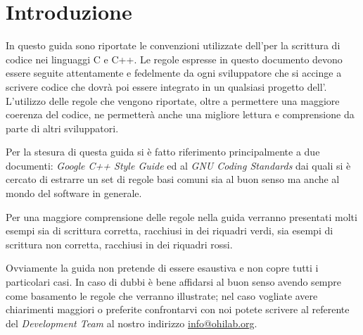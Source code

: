 %

\section{Introduzione}\label{sec:overview}

In questo guida sono riportate le convenzioni utilizzate dell'\associazione per la scrittura di codice nei linguaggi C e C++.
Le regole espresse in questo documento devono essere seguite attentamente e fedelmente da ogni sviluppatore che si accinge a scrivere codice che dovrà poi essere integrato in un qualsiasi progetto dell'\sigla.
L'utilizzo delle regole che vengono riportate, oltre a permettere una maggiore coerenza del codice, ne permetterà anche una migliore lettura e comprensione da parte di altri sviluppatori.

Per la stesura di questa guida si è fatto riferimento principalmente a due documenti: \emph{Google C++ Style Guide}\cite{codestyle:google} ed al \emph{GNU Coding Standards}\cite{codestyle:gnu} dai quali si è cercato di estrarre un set di regole basi comuni sia al buon senso ma anche al mondo del software in generale.

Per una maggiore comprensione delle regole nella guida verranno presentati molti esempi sia di scrittura corretta, racchiusi in dei riquadri verdi, sia esempi di scrittura non corretta, racchiusi in dei riquadri rossi.

Ovviamente la guida non pretende di essere esaustiva e non copre tutti i particolari casi.
In caso di dubbi è bene affidarsi al buon senso avendo sempre come basamento le regole che verranno illustrate; nel caso vogliate avere chiarimenti maggiori o preferite confrontarvi con noi potete scrivere al referente del \emph{Development Team} al nostro indirizzo \url{info@ohilab.org}.
